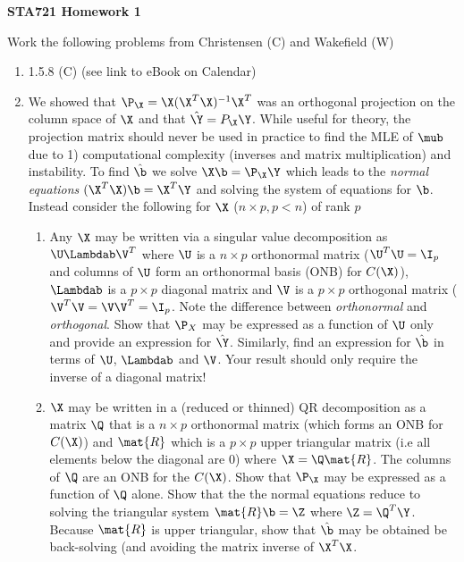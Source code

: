 \documentclass[12pt]{article}
\begin{document}
{\bf STA721 \hfill Homework 1}

\vspace{.5in}
\noindent
Work the following problems from Christensen (C) and Wakefield (W)
\begin{enumerate}
\item 1.5.8 (C) (see link to eBook on Calendar)

\item We showed that $\P_\X = \X(\X^T\X)^{-1}\X^T$ was an orthogonal
  projection on the column space of $\X$ and that $\hat{\Y} = P_\X \Y$.
  While useful for theory, the projection matrix should never be used
  in practice to find the MLE of $\mub$ due to 1) computational
  complexity (inverses and matrix multiplication) and instability.  To
  find $\hat{\b}$ we solve $\X \b = \P_\X \Y $ which
  leads to the {\it normal equations}  $(\X^T\X) \b = \X^T\Y$ and
  solving the system of equations for $\b$.
  Instead consider the following for $\X$ ($n \times p, p < n$) of rank $p$

  \begin{enumerate}
  \item Any $\X$ may be written via a singular value decomposition as
    $\U \Lambdab \V^T$ where $\U$ is a $n \times p$ orthonormal matrix
    ($\U^T\U = \I_p$ and columns of $\U$ form an orthonormal basis (ONB) for
    $C(\X)$), $\Lambdab$ is a $p \times p$ diagonal matrix and $\V$ is
    a $p \times p$ orthogonal matrix ($\V^T\V = \V \V^T = \I_p$. Note
    the difference between {\it orthonormal} and {\it orthogonal}.
    Show that $\P_X$ may be expressed as a function of $\U$ only and
    provide an expression for $\hat{\Y}$.  Similarly, find an
    expression for $\hat{\b}$ in terms of $\U$, $\Lambdab$ and $\V$.
    Your result should only require the inverse of a diagonal matrix!
\item $\X$ may be written in a (reduced or thinned) QR decomposition as a matrix
  $\Q$ that is a $n \times p$ orthonormal matrix (which forms an ONB
  for $C(\X)$) and $\mat{R}$ which is a $p
  \times p$ upper triangular matrix (i.e all elements below the
  diagonal are 0) where $\X = \Q \mat{R}$. The columns of $\Q$ are an ONB for
  the $C(\X)$. Show that $\P_\X$
  may be expressed as a function of $\Q$ alone.   Show that  the 
 the normal equations reduce to solving the triangular system $\mat{R} \b = \Z$ where $\Z = \Q^T \Y$.
 Because $\mat{R}$ is upper triangular, show that $\hat{\b}$ may be
 obtained be back-solving (and avoiding the matrix inverse of $\X^T\X$.
   

\end{enumerate}
\end{enumerate}
\end{document}
